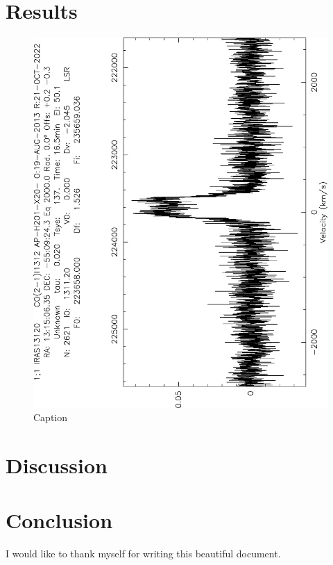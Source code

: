 \documentclass[reprint,english,notitlepage]{revtex4-2}  %
\begin{document}
\section{Results}
\begin{figure}[h!]
    \centering
    \includegraphics[scale = 0.4, angle = -90]{spect_only.eps}
    \caption{Caption}
    \label{fig: reduced data class}
\end{figure}

\section{Discussion}
\section{Conclusion}
\begin{acknowledgments}  %
I would like to thank myself for writing this beautiful document.
\end{acknowledgments}
\end{document}
